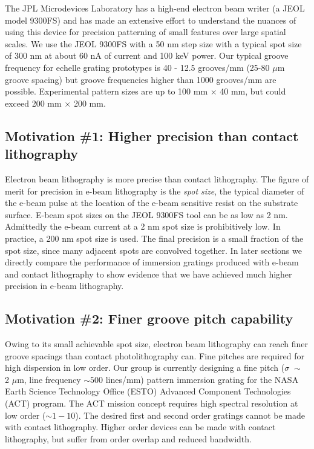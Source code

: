 \documentclass[]{spie}  %
\begin{document}
The JPL Microdevices Laboratory has a high-end electron beam writer (a JEOL model 9300FS) and has made an extensive effort to understand the nuances of using this device for precision patterning of small features over large spatial scales.  We use the JEOL 9300FS with a 50 nm step size with a typical spot size of 300 nm at about 60 nA of current and 100 keV power. Our typical groove frequency for echelle grating prototypes is 40 - 12.5 grooves/mm (25-80 $\mu$m groove spacing) but groove frequencies higher than 1000 grooves/mm are possible. Experimental pattern sizes are up to 100 mm $\times$ 40 mm, but could exceed 200 mm $\times$ 200 mm.

\subsection{Motivation \#1: Higher precision than contact lithography}
\label{sec:Precis}
Electron beam lithography is more precise than contact lithography.  The figure of merit for precision in e-beam lithography is the \emph{spot size}, the typical diameter of the e-beam pulse at the location of the e-beam sensitive resist on the substrate surface.  E-beam spot sizes on the JEOL 9300FS tool can be as low as 2 nm.  Admittedly the e-beam current at a 2 nm spot size is prohibitively low.  In practice, a 200 nm spot size is used.  The final precision is a small fraction of the spot size, since many adjacent spots are convolved together.  In later sections we directly compare the performance of immersion gratings produced with e-beam and contact lithography to show evidence that we have achieved much higher precision in e-beam lithography.  

\subsection{Motivation \#2: Finer groove pitch capability}
Owing to its small achievable spot size, electron beam lithography can reach finer groove spacings than contact photolithography can.  Fine pitches are required for high dispersion in low order.  Our group is currently designing a fine pitch ($\sigma \; \sim$ 2 $\mu$m, line frequency $\sim 500$ lines/mm) pattern immersion grating for the NASA Earth Science Technology Office (ESTO) Advanced Component Technologies (ACT) program.  The ACT mission concept requires high spectral resolution at low order ($\sim1-10$).  The desired first and second order gratings cannot be made with contact lithography.  Higher order devices can be made with contact lithography, but suffer from order overlap and reduced bandwidth.
\end{document}
